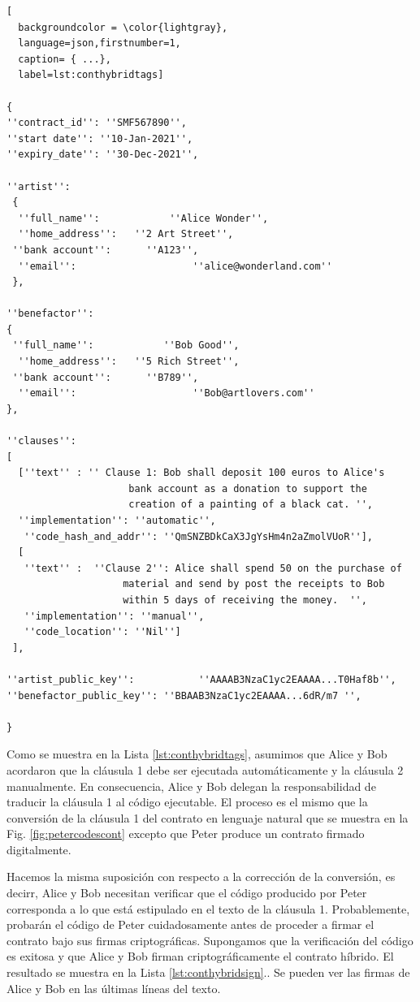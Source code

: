 \documentclass[12pt]{report} %
\begin{document}
\begin{lstlisting}[
  backgroundcolor = \color{lightgray},
  language=json,firstnumber=1,
  caption= { ...},
  label=lst:conthybridtags]
  
{
''contract_id'': ''SMF567890'',
''start date'': ''10-Jan-2021'',
''expiry_date'': ''30-Dec-2021'',

''artist'':
 {
  ''full_name'':            ''Alice Wonder'',
  ''home_address'':   ''2 Art Street'',
 ''bank account'':      ''A123'',
  ''email'':                    ''alice@wonderland.com''
 },
 
''benefactor'':
{
 ''full_name'':            ''Bob Good'',
  ''home_address'':   ''5 Rich Street'',
 ''bank account'':      ''B789'',
  ''email'':                    ''Bob@artlovers.com''
},
 
''clauses'':
[
  [''text'' : '' Clause 1: Bob shall deposit 100 euros to Alice's 
                     bank account as a donation to support the 
                     creation of a painting of a black cat. '',
  ''implementation'': ''automatic'',
   ''code_hash_and_addr'': ''QmSNZBDkCaX3JgYsHm4n2aZmolVUoR''],
  [
   ''text'' :  ''Clause 2'': Alice shall spend 50 on the purchase of 
                    material and send by post the receipts to Bob 
                    within 5 days of receiving the money.  '',
   ''implementation'': ''manual'',
   ''code_location'': ''Nil'']
 ],
 
''artist_public_key'':           ''AAAAB3NzaC1yc2EAAAA...T0Haf8b'',
''benefactor_public_key'': ''BBAAB3NzaC1yc2EAAAA...6dR/m7 '',

}
\end{lstlisting}



Como se muestra en la Lista \ref{lst:conthybridtags}, asumimos que Alice y Bob acordaron que la cláusula 1 debe ser ejecutada automáticamente y la cláusula 2 manualmente. En consecuencia, Alice y Bob delegan la responsabilidad de traducir la cláusula 1 al código ejecutable. El proceso es el mismo que la conversión de la cláusula 1 del contrato en lenguaje natural que se muestra en la Fig. \ref{fig:petercodescont} excepto que Peter produce un contrato firmado digitalmente.

Hacemos la misma suposición con respecto a la corrección de la conversión, es decirr, Alice y Bob necesitan verificar que el código producido por Peter corresponda a lo que está estipulado en el texto de la cláusula 1. Probablemente, probarán el código de Peter cuidadosamente antes de proceder a firmar el contrato bajo sus firmas criptográficas. Supongamos que la verificación del código es exitosa y que Alice y Bob firman criptográficamente el contrato híbrido. El resultado se muestra en la Lista \ref{lst:conthybridsign}.. Se pueden ver las firmas de Alice y Bob en las últimas líneas del texto.
\end{document}
